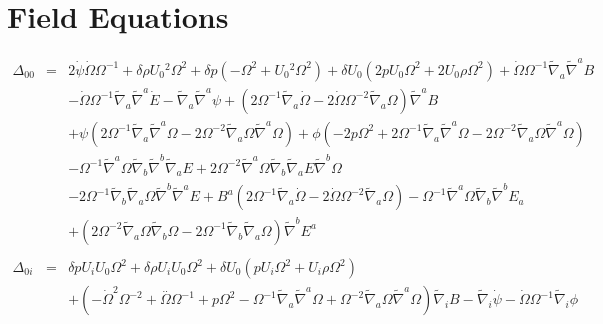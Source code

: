 \documentclass[10pt,letterpaper]{article}
\numberwithin{equation}{section}
\begin{document}
\section{Field Equations}
%
\begin{eqnarray}
\Delta_{00}&=& 2 \dot{\psi} \dot{\Omega} \Omega^{-1} + \delta \rho U_{0}{}^2 \Omega^2 + \delta p (- \Omega^2 + U_{0}{}^2 \Omega^2) + \delta U_{0}{} (2 p U_{0}{} \Omega^2 + 2 U_{0}{} \rho \Omega^2) + \dot{\Omega} \Omega^{-1} \tilde{\nabla}_{a}\tilde{\nabla}^{a}B \nonumber \\ 
&& -  \dot{\Omega} \Omega^{-1} \tilde{\nabla}_{a}\tilde{\nabla}^{a}\dot{E} -  \tilde{\nabla}_{a}\tilde{\nabla}^{a}\psi + (2 \Omega^{-1} \tilde{\nabla}_{a}\dot{\Omega} - 2 \dot{\Omega} \Omega^{-2} \tilde{\nabla}_{a}\Omega) \tilde{\nabla}^{a}B \nonumber \\ 
&& + \psi (2 \Omega^{-1} \tilde{\nabla}_{a}\tilde{\nabla}^{a}\Omega - 2 \Omega^{-2} \tilde{\nabla}_{a}\Omega \tilde{\nabla}^{a}\Omega) + \phi (-2 p \Omega^2 + 2 \Omega^{-1} \tilde{\nabla}_{a}\tilde{\nabla}^{a}\Omega - 2 \Omega^{-2} \tilde{\nabla}_{a}\Omega \tilde{\nabla}^{a}\Omega) \nonumber \\ 
&& -  \Omega^{-1} \tilde{\nabla}^{a}\Omega \tilde{\nabla}_{b}\tilde{\nabla}^{b}\tilde{\nabla}_{a}E + 2 \Omega^{-2} \tilde{\nabla}^{a}\Omega \tilde{\nabla}_{b}\tilde{\nabla}_{a}E \tilde{\nabla}^{b}\Omega \nonumber \\ 
&& - 2 \Omega^{-1} \tilde{\nabla}_{b}\tilde{\nabla}_{a}\Omega \tilde{\nabla}^{b}\tilde{\nabla}^{a}E+B^{a} (2 \Omega^{-1} \tilde{\nabla}_{a}\dot{\Omega} - 2 \dot{\Omega} \Omega^{-2} \tilde{\nabla}_{a}\Omega) -  \Omega^{-1} \tilde{\nabla}^{a}\Omega \tilde{\nabla}_{b}\tilde{\nabla}^{b}E_{a} \nonumber \\ 
&& + (2 \Omega^{-2} \tilde{\nabla}_{a}\Omega \tilde{\nabla}_{b}\Omega - 2 \Omega^{-1} \tilde{\nabla}_{b}\tilde{\nabla}_{a}\Omega) \tilde{\nabla}^{b}E^{a}
\\  \nonumber\\ 
\Delta_{0i}&=& \delta p U_{i} U_{0}{} \Omega^2 + \delta \rho U_{i} U_{0}{} \Omega^2 + \delta U_{0}{} (p U_{i} \Omega^2 + U_{i} \rho \Omega^2) \nonumber \\ 
&& + (- \dot{\Omega}^2 \Omega^{-2} + \overset{..}{\Omega} \Omega^{-1} + p \Omega^2 -  \Omega^{-1} \tilde{\nabla}_{a}\tilde{\nabla}^{a}\Omega + \Omega^{-2} \tilde{\nabla}_{a}\Omega \tilde{\nabla}^{a}\Omega) \tilde{\nabla}_{i}B -  \tilde{\nabla}_{i}\dot{\psi} -  \dot{\Omega} \Omega^{-1} \tilde{\nabla}_{i}\phi \nonumber \\ 

\end{eqnarray}
\end{document}
